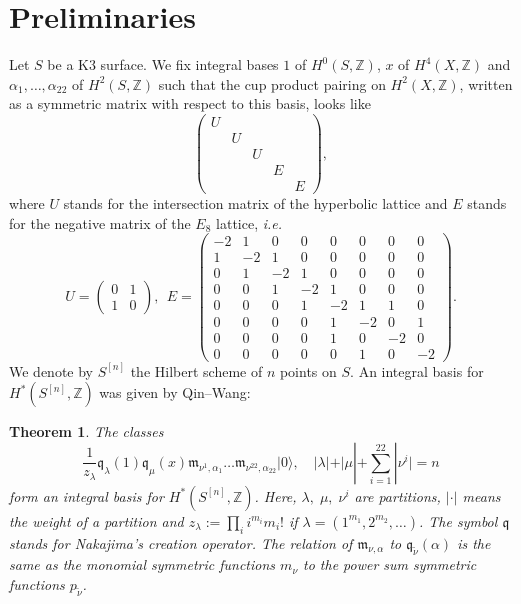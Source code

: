 \documentclass{amsart}
\newcommand{\hilb}[1]{^{[#1]}}
\newcommand{\ie}{{\it i.e. }}
\newcommand{\vac}{|0\rangle}
\newcommand{\coloneqq}{:=}
\newcommand{\IZ}{\mathbb{Z}}
\newcommand{\km}{\mathfrak{m}}
\newcommand{\kq}{\mathfrak{q}}
\theoremstyle{plain}
\newtheorem{theorem}{Theorem}[section]
\theoremstyle{definition}
\theoremstyle{remark}
\begin{document}
\section{Preliminaries}
Let $S$ be a K3 surface. We fix integral bases $1$ of $H^0(S,\IZ)$, $x$ of $H^4(X,\IZ)$ and $\alpha_1,\ldots ,\alpha_{22}$ of $H^2(S,\IZ)$ such that the cup product pairing on $H^2(X,\IZ)$, written as a symmetric matrix with respect to this basis, looks like
$$
\left(\begin{array}{ccccc}
U&&&& \\
&U&&& \\
&&U&& \\
&&&E& \\
&&&&E \end{array}\right),
$$
where $U$ stands for the intersection matrix of the hyperbolic lattice and $E$ stands for the negative matrix of the $E_8$ lattice, \ie 
\begin{equation*}
U = 
\left(\begin{array}{cc}
0&1\\1&0 \end{array}\right),
\ \ E = \left(\begin{array}{cccccccc}
-2&1&0&0&0&0&0&0\\1&-2&1&0&0&0&0&0\\0&1&-2&1&0&0&0&0\\0&0&1&-2&1&0&0&0\\0&0&0&1&-2&1&1&0\\0&0&0&0&1&-2&0&1\\0&0&0&0&1&0&-2&0\\0&0&0&0&0&1&0&-2
\end{array}\right).
\end{equation*}
We denote by $S\hilb{n}$ the Hilbert scheme of $n$ points on $S$. An integral basis for $H^\ast(S\hilb{n},\IZ)$ was given by Qin--Wang:
\begin{theorem} \cite[Thm. 5.4.]{QinWang} The classes
$$ \frac{1}{z_\lambda} \kq_\lambda(1)\kq_\mu(x)\km_{\nu^1,\alpha_1}\ldots\km_{\nu^{22},\alpha_{22}}\vac,\quad |\lambda| + |\mu| + \sum_{i=1}^{22}|\nu^i| = n
$$ 
form an integral basis for $H^\ast(S\hilb{n},\IZ)$. Here,
$\lambda,\; \mu,\; \nu^i$ are partitions, $|\cdot|$ means the weight of a partition and $z_\lambda \coloneqq\prod_i i^{m_i} m_i!$ if $\lambda = (1^{m_1},2^{m_2},\ldots)$. The symbol $\kq$ stands for Nakajima's creation operator. 
The relation of $\km_{\nu,\alpha}$ to $\kq_{\tilde{\nu}}(\alpha)$ is the same as the monomial symmetric functions
$m_\nu$ to the power sum symmetric functions 
$p_{\tilde{\nu}}$.

\end{theorem}
\end{document}
